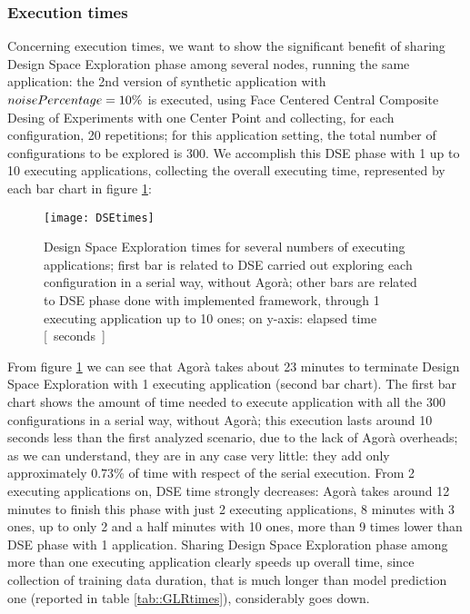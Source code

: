 \subsubsection{Execution times}

Concerning execution times, we want to show the significant benefit of sharing Design Space Exploration phase among several nodes, running the same application: the 2nd version of synthetic application with $noise\-Percentage = 10\%$ is executed, using Face Centered Central Composite Desing of Experiments with one Center Point and collecting, for each configuration, 20 repetitions; for this application setting, the total number of configurations to be explored is 300. We accomplish this DSE phase with 1 up to 10 executing applications, collecting the overall executing time, represented by each bar chart in figure \ref{fig::DSEtimes}:

\begin{figure}[h]

    \centering
    \texttt{[image: DSEtimes]}
    \caption[Design Space Exploration times for several numbers of executing applications]{Design Space Exploration times for several numbers of executing applications; first bar is related to DSE carried out exploring each configuration in a serial way, without Agorà; other bars are related to DSE phase done with implemented framework, through 1 executing application up to 10 ones; on y-axis: elapsed time \hbox{[ seconds ]}}
    \label{fig::DSEtimes}
    
\end{figure}

From figure \ref{fig::DSEtimes} we can see that Agorà takes about 23 minutes to terminate Design Space Exploration with 1 executing application (second bar chart). The first bar chart shows the amount of time needed to execute application with all the 300 configurations in a serial way, without Agorà; this execution lasts around 10 seconds less than the first analyzed scenario, due to the lack of Agorà overheads; as we can understand, they are in any case very little: they add only approximately $0.73\%$ of time with respect of the serial execution. From 2 executing applications on, DSE time strongly decreases: Agorà takes around 12 minutes to finish this phase with just 2 executing applications, 8 minutes with 3 ones, up to only 2 and a half minutes with 10 ones, more than 9 times lower than DSE phase with 1 application. Sharing Design Space Exploration phase among more than one executing application clearly speeds up overall time, since collection of training data duration, that is much longer than model prediction one (reported in table \ref{tab::GLRtimes}), considerably goes down.

